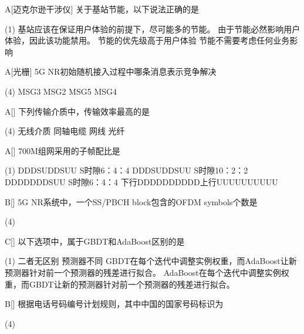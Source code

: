 \begin{choice}{A}[迈克尔逊干涉仪]
	关于基站节能，以下说法正确的是
	\begin{tasks}(1)
		\task 基站应该在保证用户体验的前提下，尽可能多的节能。
		\task 由于节能必然影响用户体验，因此该功能禁用。
		\task 节能的优先级高于用户体验
		\task 节能不需要考虑任何业务影响
	\end{tasks}
\end{choice}


\begin{choice}{A}[光栅]
	5G NR初始随机接入过程中哪条消息表示竞争解决
	\begin{tasks}(4)
		\task MSG3
		\task MSG2
		\task MSG5
		\task MSG4
	\end{tasks}
\end{choice}

\begin{choice}{A}[]
	下列传输介质中，传输效率最高的是
	\begin{tasks}(4)
		\task 无线介质
		\task 同轴电缆
		\task 网线
		\task 光纤
	\end{tasks}
\end{choice}


\begin{choice}{A}[]
	700M组网采用的子帧配比是
	\begin{tasks}(1)
		\task DDDSUDDSUU S时隙6：4：4
		\task DDDSUDDSUU S时隙10：2：2
		\task DDDDDDDSUU S时隙6：4：4
		\task 下行DDDDDDDDDD上行UUUUUUUUUU
	\end{tasks}
\end{choice}


\begin{choice}{B}[]
	5G NR系统中，一个SS/PBCH block包含的OFDM symbols个数是
	\begin{tasks}(4)
	\end{tasks}
\end{choice}


\begin{choice}{C}[]
	以下选项中，属于GBDT和AdaBoost区别的是
	\begin{tasks}(1)
		\task 二者无区别
		\task 预测器不同
		\task GBDT在每个迭代中调整实例权重，而AdaBoost让新预测器针对前一个预测器的残差进行拟合。
		\task AdaBoost在每个迭代中调整实例权重，而GBDT让新的预测器针对前一个预测器的残差进行拟合。
	\end{tasks}
\end{choice}

\begin{choice}{B}[]
	根据电话号码编号计划规则，其中中国的国家号码标识为
	\begin{tasks}(4)
	\end{tasks}
\end{choice}

